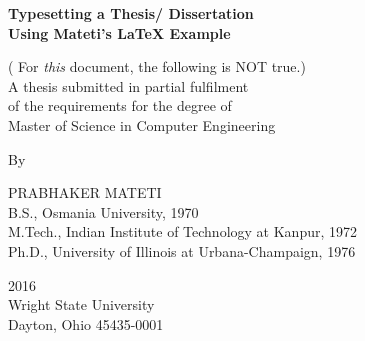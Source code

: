 

\thispagestyle{empty}


\begin{center}

{\bf\Huge
Typesetting a Thesis/ Dissertation\\
Using Mateti's {\LaTeX} Example\\ %
}
\par\vskip 4cm

(\TBD{} For {\it this} document, the following is NOT true.)\\
A thesis submitted in partial fulfilment\\
of the requirements for the degree of\\
Master of Science in Computer Engineering\\  %

\par\vskip 2cm
By\\
\par\vskip 2cm


PRABHAKER MATETI\\              %
B.S., Osmania University, 1970\\        %
M.Tech., Indian Institute of Technology at Kanpur, 1972\\
Ph.D., University of Illinois at Urbana-Champaign, 1976\\


\vfill

2016\\                          %
Wright State University\\
Dayton, Ohio 45435-0001\\


\end{center}

\newpage

